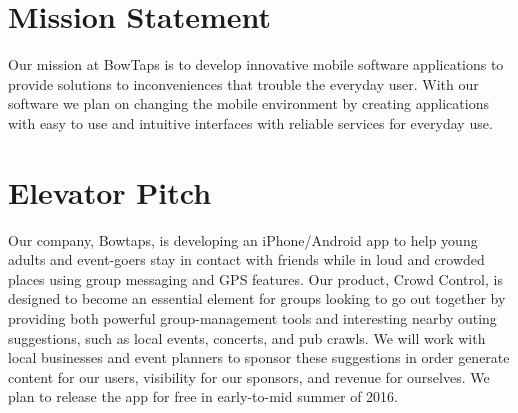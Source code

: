 
\section{Mission Statement}
Our mission at BowTaps is to develop innovative mobile software applications to provide solutions to inconveniences that trouble the everyday user. With our software we plan on changing the mobile environment by creating applications with easy to use and  intuitive interfaces with reliable services for everyday use.  

\section{Elevator Pitch}

Our company, Bowtaps, is developing an iPhone/Android app to help young adults and event-goers stay in contact with friends while in loud and crowded places using group messaging and GPS features.
\newline\newline
Our product, Crowd Control, is designed to become an essential element for groups looking to go out together by providing both powerful group-management tools and interesting nearby outing suggestions, such as local events, concerts, and pub crawls.
\newline\newline
We will work with local businesses and event planners to sponsor these suggestions in order generate content for our users, visibility for our sponsors, and revenue for ourselves.
\newline \newline
We plan to release the app for free in early-to-mid summer of 2016.
